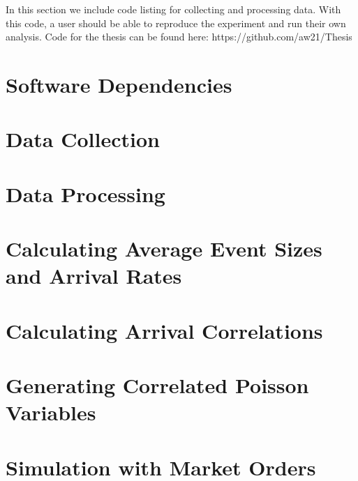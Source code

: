 In this section we include code listing for collecting and processing data. With this code, a user should be able to reproduce the experiment and run their own analysis. Code for the thesis can be found here: https://github.com/aw21/Thesis

\section{Software Dependencies}


\section{Data Collection}
\label{data-collection-code}

\section{Data Processing}
\label{data-processing-code}

\section{Calculating Average Event Sizes and Arrival Rates}
\label{AES_and_rate_code}

\section{Calculating Arrival Correlations}
\label{correlation-code}

\section{Generating Correlated Poisson Variables}
\label{correlated-poisson}

\section{Simulation with Market Orders}
\label{code:simulation}